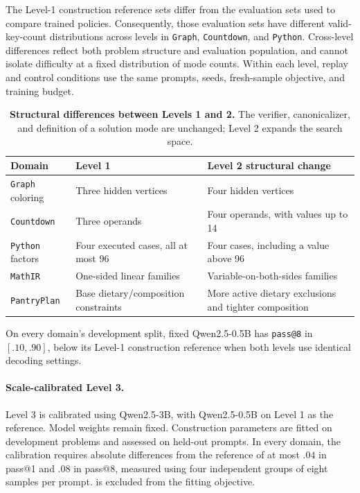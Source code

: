 The Level-1 construction reference sets differ from the evaluation sets used
to compare trained policies. Consequently, those evaluation sets have different
valid-key-count distributions across levels in \texttt{Graph},
\texttt{Countdown}, and \texttt{Python}. Cross-level differences reflect both
problem structure and evaluation population, and cannot isolate difficulty
at a fixed distribution of mode counts. Within each level, replay and control
conditions use the same prompts, seeds, fresh-sample objective, and training
budget.

\begin{table}[!htbp]
\centering
\caption{\textbf{Structural differences between Levels 1 and 2.}
The verifier, canonicalizer, and definition of a solution mode are unchanged;
Level 2 expands the search space.}
\label{tab:level2-structure}
\small
\begin{tabularx}{.96\linewidth}{@{}lYY@{}}
\toprule
\textbf{Domain} & \textbf{Level 1} & \textbf{Level 2 structural change} \\
\midrule
\texttt{Graph} coloring & Three hidden vertices & Four hidden vertices \\
\texttt{Countdown} & Three operands & Four operands, with values up to 14 \\
\texttt{Python} factors & Four executed cases, all at most 96 & Four cases, including a value above 96 \\
\texttt{MathIR} & One-sided linear families & Variable-on-both-sides families \\
\texttt{PantryPlan} & Base dietary/composition constraints & More active dietary exclusions and tighter composition \\
\bottomrule
\end{tabularx}
\end{table}

On every domain's development split, fixed Qwen2.5-0.5B has
\texttt{pass@8} in $[.10,.90]$, below its Level-1 construction reference
when both levels use identical decoding settings.

\paragraph{Scale-calibrated Level 3.}
Level 3 is calibrated using Qwen2.5-3B, with Qwen2.5-0.5B on Level 1 as the
reference. Model weights remain fixed. Construction parameters are fitted
on development problems and assessed on held-out prompts. In every domain,
the calibration requires absolute differences from the reference of at most
$.04$ in pass@1 and $.08$ in pass@8, measured using four independent groups
of eight samples per prompt. \distk{} is excluded from the fitting objective.

